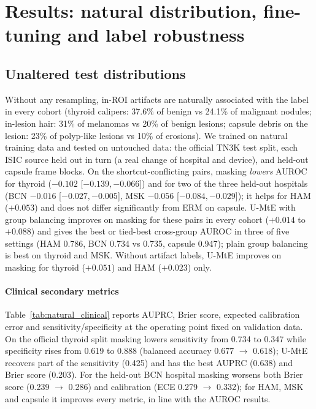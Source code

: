 \section{Results: natural distribution, fine-tuning and label robustness}\label{sec:robust}

\subsection{Unaltered test distributions}
Without any resampling, in-ROI artifacts are naturally associated with the label in every cohort (thyroid calipers:
37.6\% of benign vs 24.1\% of malignant nodules; in-lesion hair: 31\% of melanomas vs 20\% of benign lesions;
capsule debris on the lesion: 23\% of polyp-like lesions vs 10\% of erosions). We trained on natural training data
and tested on untouched data: the official TN3K test split, each ISIC source held out in turn (a real change of
hospital and device), and held-out capsule frame blocks. On the shortcut-conflicting pairs, masking \emph{lowers}
AUROC for thyroid ($-0.102$ [$-0.139, -0.066$]) and for two of the three held-out hospitals (BCN $-0.016$
[$-0.027, -0.005$], MSK $-0.056$ [$-0.084, -0.029$]); it helps for HAM ($+0.053$) and does not differ significantly
from ERM on capsule. U-MtE with group balancing improves on masking for these pairs in every cohort ($+0.014$ to $+0.088$) and gives the best or tied-best cross-group AUROC in three of five settings (HAM
0.786, BCN 0.734 vs 0.735, capsule 0.947); plain group balancing is best on thyroid and MSK. Without artifact labels,
U-MtE improves on masking for thyroid ($+0.051$) and HAM ($+0.023$) only.

\paragraph{Clinical secondary metrics} Table~\ref{tab:natural_clinical} reports AUPRC, Brier score, expected
calibration error and sensitivity/specificity at the operating point fixed on validation data. On the official
thyroid split masking lowers sensitivity from 0.734 to 0.347 while specificity rises from 0.619 to 0.888 (balanced
accuracy 0.677 $\to$ 0.618); U-MtE recovers part of the sensitivity (0.425) and has the best AUPRC (0.638) and Brier
score (0.203). For the held-out BCN hospital masking worsens both Brier score (0.239 $\to$ 0.286) and calibration
(ECE 0.279 $\to$ 0.332); for HAM, MSK and capsule it improves every metric, in line with the AUROC results.


